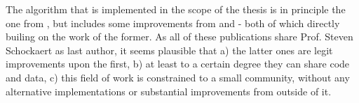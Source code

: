 
The algorithm that is implemented in the scope of the thesis is in principle the one from \textcite{Derrac2015}, but includes some improvements from \textcite{Ager2018} and \textcite{Alshaikh2020} - both of which directly builing on the work of the former. As all of these publications share Prof. Steven Schockaert as last author, it seems plausible that a) the latter ones are legit improvements upon the first, b) at least to a certain degree they can share code and data, c) this field of work is constrained to a small community, without any alternative implementations or substantial improvements from outside of it.




